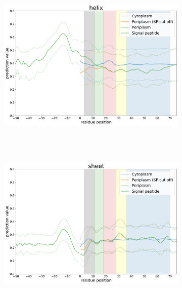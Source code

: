 ~\begin{figure}[h!]
	~\begin{subfigure}[b]{\linewidth}
		\centering
		\includegraphics[width=\linewidth, height=0.46\textheight, keepaspectratio]{./results/general_comparison/local_comparison/img/local_helix.pdf}
		\label{fig:local_helix}
	~\end{subfigure}
	\newline
	~\begin{subfigure}[b]{\linewidth}
		\centering
		\includegraphics[width=\linewidth, height=0.46\textheight, keepaspectratio]{./results/general_comparison/local_comparison/img/local_sheet.pdf}
		\label{fig:local_sheet}
	~\end{subfigure}
~\end{figure}

